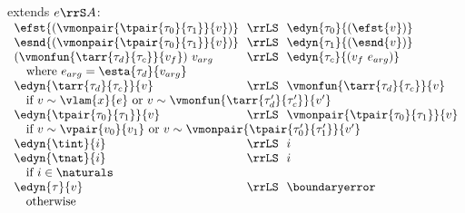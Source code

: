 \begin{flushleft}
\begin{minipage}[t]{\columnwidth}
 extends $e \rrS A$:\\
$\begin{array}{l@{~~}c@{~~}l}
  \efst{(\vmonpair{\tpair{\tau_0}{\tau_1}}{v})} & \rrLS & \edyn{\tau_0}{(\efst{v})}
\\
  \esnd{(\vmonpair{\tpair{\tau_0}{\tau_1}}{v})} & \rrLS & \edyn{\tau_1}{(\esnd{v})}
\\
  (\vmonfun{\tarr{\tau_d}{\tau_c}}{v_f})~v_{arg} & \rrLS & \edyn{\tau_c}{(v_f~e_{arg})}
\\ \multicolumn{3}{l}{\mbox{\quad where $e_{arg} = \esta{\tau_d}{v_{arg}}$}}
\\
  \edyn{\tarr{\tau_d}{\tau_c}}{v} & \rrLS & \vmonfun{\tarr{\tau_d}{\tau_c}}{v}
\\ \multicolumn{3}{l}{\mbox{\quad if $v \sim \vlam{x}{e}$ or $v \sim \vmonfun{\tarr{\tau_d'}{\tau_c'}}{v'}$}}
\\
  \edyn{\tpair{\tau_0}{\tau_1}}{v} & \rrLS & \vmonpair{\tpair{\tau_0}{\tau_1}}{v}
\\ \multicolumn{3}{l}{\mbox{\quad if $v \sim \vpair{v_0}{v_1}$ or $v \sim \vmonpair{\tpair{\tau_0'}{\tau_1'}}{v'}$}}
\\
  \edyn{\tint}{i} & \rrLS & i
\\
  \edyn{\tnat}{i} & \rrLS & i
\\ \multicolumn{3}{l}{\mbox{\quad if $i \in \naturals$}}
\\
  \edyn{\tau}{v} & \rrLS & \boundaryerror
\\ \multicolumn{3}{l}{\mbox{\quad otherwise}}
\end{array}$
\end{minipage}

\end{flushleft}
